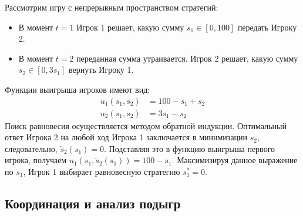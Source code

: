 \begin{example}
Рассмотрим игру с непрерывным пространством стратегий:
\begin{itemize}
    \item В момент $t = 1$ Игрок 1 решает, какую сумму $s_1 \in [0, 100]$ передать Игроку 2.
    \item В момент $t = 2$ переданная сумма утраивается. Игрок 2 решает, какую сумму $s_2 \in [0, 3s_1]$ вернуть Игроку 1.
\end{itemize}
Функции выигрыша игроков имеют вид:
\begin{align}
    u_1(s_1, s_2) &= 100 - s_1 + s_2 \\
    u_2(s_1, s_2) &= 3s_1 - s_2
\end{align}
Поиск равновесия осуществляется методом обратной индукции. Оптимальный ответ Игрока 2 на любой ход Игрока 1 заключается в минимизации $s_2$, следовательно, $\check{s}_2(s_1) = 0$. Подставляя это в функцию выигрыша первого игрока, получаем $u_1(s_1, \check{s}_2(s_1)) = 100 - s_1$. Максимизируя данное выражение по $s_1$, Игрок 1 выбирает равновесную стратегию $s_1^* = 0$.
\end{example}

\subsection{Координация и анализ подыгр}

